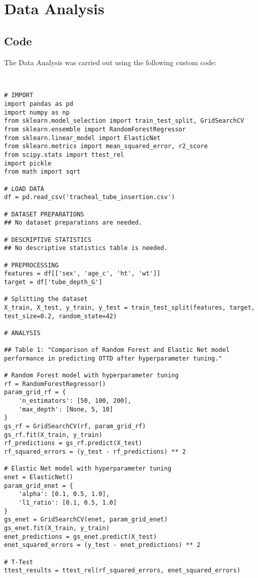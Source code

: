 \documentclass[11pt]{article}
\begin{document}
\section{Data Analysis}
\subsection{{Code}}
The Data Analysis was carried out using the following custom code:

\begin{verbatim}


# IMPORT
import pandas as pd
import numpy as np
from sklearn.model_selection import train_test_split, GridSearchCV
from sklearn.ensemble import RandomForestRegressor
from sklearn.linear_model import ElasticNet
from sklearn.metrics import mean_squared_error, r2_score
from scipy.stats import ttest_rel
import pickle
from math import sqrt

# LOAD DATA
df = pd.read_csv('tracheal_tube_insertion.csv')

# DATASET PREPARATIONS
## No dataset preparations are needed.

# DESCRIPTIVE STATISTICS
## No descriptive statistics table is needed.

# PREPROCESSING
features = df[['sex', 'age_c', 'ht', 'wt']]
target = df['tube_depth_G']

# Splitting the dataset
X_train, X_test, y_train, y_test = train_test_split(features, target, test_size=0.2, random_state=42)

# ANALYSIS

## Table 1: "Comparison of Random Forest and Elastic Net model performance in predicting OTTD after hyperparameter tuning."

# Random Forest model with hyperparameter tuning
rf = RandomForestRegressor()
param_grid_rf = {
    'n_estimators': [50, 100, 200],
    'max_depth': [None, 5, 10]
}
gs_rf = GridSearchCV(rf, param_grid_rf)
gs_rf.fit(X_train, y_train)
rf_predictions = gs_rf.predict(X_test)
rf_squared_errors = (y_test - rf_predictions) ** 2

# Elastic Net model with hyperparameter tuning
enet = ElasticNet()
param_grid_enet = {
    'alpha': [0.1, 0.5, 1.0],
    'l1_ratio': [0.1, 0.5, 1.0]
}
gs_enet = GridSearchCV(enet, param_grid_enet)
gs_enet.fit(X_train, y_train)
enet_predictions = gs_enet.predict(X_test)
enet_squared_errors = (y_test - enet_predictions) ** 2

# T-Test
ttest_results = ttest_rel(rf_squared_errors, enet_squared_errors)


\end{verbatim}
\end{document}
